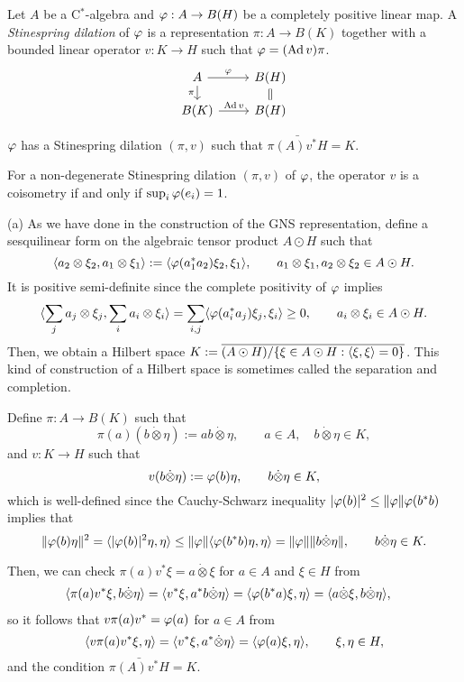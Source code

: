 \documentclass{../../large}
\begin{document}
\begin{prb}
Let $A$ be a C$^*$-algebra and $\varphi:A\to B(H)$ be a completely positive linear map.
A \emph{Stinespring dilation} of $\varphi$ is a representation $\pi:A\to B(K)$ together with a bounded linear operator $v:K\to H$ such that $\varphi=(\operatorname{Ad} v)\pi$.
\[\begin{tikzcd}[row sep=small]
A \rar{\f}\dar[swap]{\pi} & B(H) \dar[equals]\\
B(K) \rar{\Ad v} & B(H)
\end{tikzcd}\]
\begin{parts}
\item $\varphi$ has a Stinespring dilation $(\pi,v)$ such that $\bar{\pi(A)v^*H}=K$.
\item For a non-degenerate Stinespring dilation $(\pi,v)$ of $\varphi$, the operator $v$ is a coisometry if and only if $\sup_i\varphi(e_i)=1$.
\end{parts}
\end{prb}
\begin{pf}
(a)
As we have done in the construction of the GNS representation, define a sesquilinear form on the algebraic tensor product $A\odot H$ such that
\[\langle a_2\otimes\xi_2,a_1\otimes\xi_1\rangle:=\langle\varphi(a_1^*a_2)\xi_2,\xi_1\rangle,\qquad a_1\otimes\xi_1,a_2\otimes\xi_2\in A\odot H.\]
It is positive semi-definite since the complete positivity of $\varphi$ implies
\[\langle\sum_ja_j\otimes\xi_j,\sum_ia_i\otimes\xi_i\rangle=\sum_{i,j}\langle\varphi(a_i^*a_j)\xi_j,\xi_i\rangle\ge0,\qquad a_i\otimes\xi_i\in A\odot H.\]
Then, we obtain a Hilbert space $K:=\overline{(A\odot H)/\{\xi\in A\odot H:\langle\xi,\xi\rangle=0\}}$.
This kind of construction of a Hilbert space is sometimes called the separation and completion.

Define $\pi:A\to B(K)$ such that
\[\pi(a)(b\dot\otimes\eta):=ab\dot\otimes\eta,\qquad a\in A,\quad b\dot\otimes\eta\in K,\]
and $v:K\to H$ such that
\[v(b\dot\otimes\eta):=\varphi(b)\eta,\qquad b\dot\otimes\eta\in K,\]
which is well-defined since the Cauchy-Schwarz inequality $|\varphi(b)|^2\le\|\varphi\|\varphi(b^*b)$ implies that
\[\|\varphi(b)\eta\|^2=\langle|\varphi(b)|^2\eta,\eta\rangle\le\|\varphi\|\langle\varphi(b^*b)\eta,\eta\rangle=\|\varphi\|\|b\dot\otimes\eta\|,\qquad b\dot\otimes\eta\in K.\]

Then, we can check $\pi(a)v^*\xi=a\dot\otimes\xi$ for $a\in A$ and $\xi\in H$ from
\begin{align*}
\langle\pi(a)v^*\xi,b\dot\otimes\eta\rangle&=\langle v^*\xi,a^*b\dot\otimes\eta\rangle=\langle\varphi(b^*a)\xi,\eta\rangle=\langle a\dot\otimes\xi,b\dot\otimes\eta\rangle,
\end{align*}
so it follows that $v\pi(a)v^*=\varphi(a)$ for $a\in A$ from
\[\langle v\pi(a)v^*\xi,\eta\rangle=\langle v^*\xi,a^*\dot\otimes\eta\rangle=\langle\varphi(a)\xi,\eta\rangle,\qquad\xi,\eta\in H,\]
and the condition $\bar{\pi(A)v^*H}=K$.


\end{pf}
\end{document}

